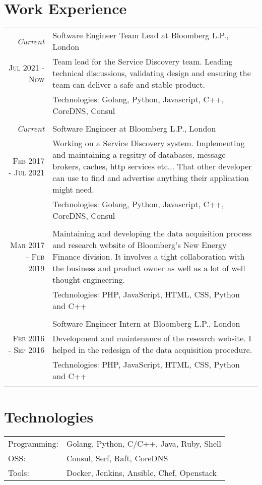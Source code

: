 \documentclass[a4paper,10pt]{article}
\begin{document}
\section{Work Experience}
\begin{tabular}{r|p{11cm}}
	\emph{Current} & \large{Software Engineer Team Lead at Bloomberg L.P., London} \\
	\textsc{Jul 2021 - Now}&\footnotesize{Team lead for the Service Discovery team. Leading technical discussions, validating design and ensuring the team can deliver a safe and stable product.}\\
	&\footnotesize{Technologies: Golang, Python, Javascript, C++, CoreDNS, Consul}\\\multicolumn{2}{c}{} \\
	\emph{Current} & \large{Software Engineer at Bloomberg L.P., London} \\
	\textsc{Feb 2017 - Jul 2021}&\footnotesize{Working on a Service Discovery system. Implementing and maintaining a regsitry of databases, message brokers, caches, http services etc... That other developer can use to find and advertise anything their application might need.}\\
	&\footnotesize{Technologies: Golang, Python, Javascript, C++, CoreDNS, Consul}\\\multicolumn{2}{c}{} \\
	\textsc{Mar 2017 - Feb 2019}&\footnotesize{Maintaining and developing the data acquisition process and research website of Bloomberg's New Energy Finance division. It involves a tight collaboration with the business and product owner as well as a lot of well thought engineering.}\\
	&\footnotesize{Technologies: PHP, JavaScript, HTML, CSS, Python and C++}\\\multicolumn{2}{c}{} \\
	& \large{Software Engineer Intern at Bloomberg L.P., London} \\
	\textsc{Feb 2016 - Sep 2016}&\footnotesize{Development and maintenance of the research website. I helped in the redesign of the data acquisition procedure.}\\
	&\footnotesize{Technologies: PHP, JavaScript, HTML, CSS, Python and C++}\\\multicolumn{2}{c}{} \\
\end{tabular}

\section{Technologies}
\begin{tabular}{ll}
	Programming:& Golang, Python, C/C++, Java, Ruby, Shell\\
	OSS:& Consul, Serf, Raft, CoreDNS \\
	Tools:& Docker, Jenkins, Ansible, Chef, Openstack
\end{tabular}
\end{document}
